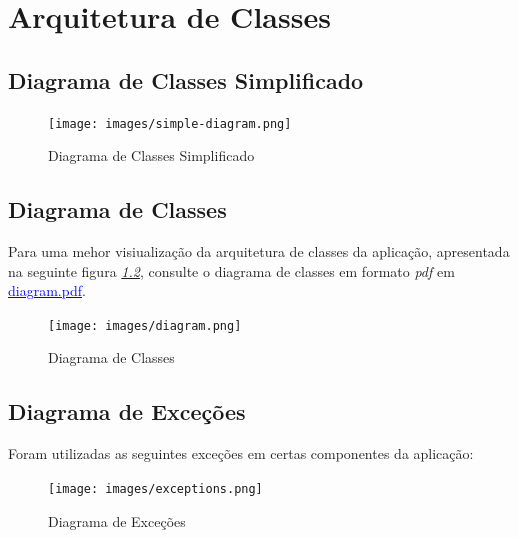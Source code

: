 \documentclass[a4paper,12pt]{scrreprt}
\begin{document}
\tableofcontents
\pagebreak
\listoffigures
\pagebreak
{}




\chapter{Arquitetura de Classes}
\section{Diagrama de Classes Simplificado}
    \begin{figure}[!ht]
        \centering
        \texttt{[image: images/simple-diagram.png]}
        \caption{Diagrama de Classes Simplificado}
        \label{fig:diagrama-classes-simplificado}
    \end{figure}
\section{Diagrama de Classes}
    Para uma mehor visiualização da arquitetura de classes da aplicação, apresentada
    na seguinte figura \textit{\ref{fig:diagrama-classes}}, consulte o diagrama de classes
    em formato \textit{pdf} em \href{diagram.pdf}{\textcolor{blue}{\underline{diagram.pdf}}}.
    \begin{figure}[!ht]
        \centering
        \texttt{[image: images/diagram.png]}
        \caption{Diagrama de Classes}
        \label{fig:diagrama-classes}
    \end{figure}
\section{Diagrama de Exceções}
    Foram utilizadas as seguintes exceções em certas componentes da aplicação:

    \begin{figure}[!ht]
        \centering
        \texttt{[image: images/exceptions.png]}
        \caption{Diagrama de Exceções}
        \label{fig:diagrama-excecoes}
    \end{figure}
\end{document}

